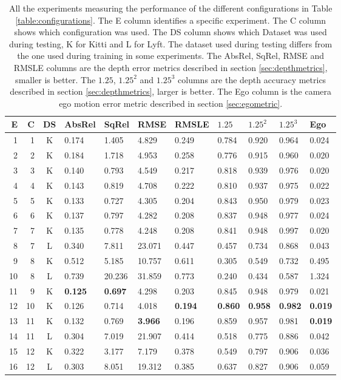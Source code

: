 \begin{table}[H]
\centering
{\setlength{\tabcolsep}{0.4em}
\begin{tabular}{|r|r|c||l|l|l|l||l|l|l||l|}
\hline
E & C & DS & AbsRel & SqRel & RMSE & RMSLE & $1.25$ & $1.25^2$ & $1.25^3$ & Ego \\
\hline
1 & 1 & K & 0.174 & 1.405 & 4.829 & 0.249 & 0.784 & 0.920 & 0.964 & 0.024 \\
\hline
2 & 2 & K & 0.184 & 1.718 & 4.953 & 0.258 & 0.776 & 0.915 & 0.960 & 0.020 \\
\hline
3 & 3 & K & 0.140 & 0.793 & 4.549 & 0.217 & 0.818 & 0.939 & 0.976 & 0.020 \\
\hline
4 & 4 & K & 0.143 & 0.819 & 4.708 & 0.222 & 0.810 & 0.937 & 0.975 & 0.022 \\
\hline
5 & 5 & K & 0.133 & 0.727 & 4.305 & 0.204 & 0.843 & 0.950 & 0.979 & 0.023 \\
\hline
6 & 6 & K & 0.137 & 0.797 & 4.282 & 0.208 & 0.837 & 0.948 & 0.977 & 0.024 \\
\hline
7 & 7 & K & 0.135 & 0.778 & 4.248 & 0.208 & 0.841 & 0.948 & 0.997 & 0.020 \\
\hline
8 & 7 & L & 0.340 & 7.811 & 23.071 & 0.447 & 0.457 & 0.734 & 0.868 & 0.043 \\
\hline
9 & 8 & K & 0.512 & 5.185 & 10.757 & 0.611 & 0.305 & 0.549 & 0.732 & 0.495 \\
\hline
10 & 8 & L & 0.739 & 20.236 & 31.859 & 0.773 & 0.240 & 0.434 & 0.587 & 1.324 \\
\hline
11 & 9 & K & \textbf{0.125} & \textbf{0.697} & 4.298 & 0.203 & 0.845 & 0.948 & 0.979 & 0.021 \\
\hline
12 & 10 & K & 0.126 & 0.714 & 4.018 & \textbf{0.194} & \textbf{0.860} & \textbf{0.958} & \textbf{0.982} & \textbf{0.019} \\
\hline
13 & 11 & K & 0.132 & 0.769 & \textbf{3.966} & 0.196 & 0.859 & 0.957 & 0.981 & \textbf{0.019} \\
\hline
14 & 11 & L & 0.304 & 7.019 & 21.907 & 0.414 & 0.518 & 0.775 & 0.886 & 0.042 \\
\hline
15 & 12 & K & 0.322 & 3.177 & 7.179 & 0.378 & 0.549 & 0.797 & 0.906 & 0.036 \\
\hline
16 & 12 & L & 0.303 & 8.051 & 19.312 & 0.385 & 0.637 & 0.827 & 0.906 & 0.059 \\
\hline
\end{tabular}}
\caption{All the experiments measuring the performance of the different configurations in Table \ref{table:configurations}. The E column identifies a specific experiment. The C column shows which configuration was used. The DS column shows which Dataset was used during testing, K for Kitti and L for Lyft. The dataset used during testing differs from the one used during training in some experiments. The AbsRel, SqRel, RMSE and RMSLE columns are the depth error metrics described in section \ref{sec:depthmetrics}, smaller is better. The $1.25$, $1.25^2$ and $1.25^3$ columns are the depth accuracy metrics described in section \ref{sec:depthmetrics}, larger is better. The Ego column is the camera ego motion error metric described in section \ref{sec:egometric}.}
\label{table:experiments}
\end{table}

